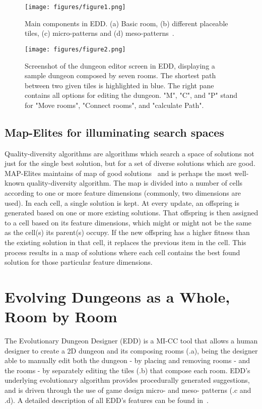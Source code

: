 \documentclass[conference]{IEEEtran}
\begin{document}
\begin{figure}[t]
\centerline{\texttt{[image: figures/figure1.png]}}
\caption{Main components in EDD. (a) Basic room, (b) different placeable tiles, (c) micro-patterns and (d) meso-patterns~\cite{Alvarez2018a}.}
\label{figs:basecomponents}
\end{figure}

\begin{figure}[t]
\centerline{\texttt{[image: figures/figure2.png]}}
\caption{Screenshot of the dungeon editor screen in EDD, displaying a sample dungeon composed by seven rooms. The shortest path between two given tiles is highlighted in blue. The right pane contains all options for editing the dungeon. "M", "C", and "P" stand for "Move rooms", "Connect rooms", and "calculate Path".}
\label{figs:dungeonscreen}
\end{figure}

\subsection{Map-Elites for illuminating search spaces}

Quality-diversity algorithms are algorithms which search a space of solutions not just for the single best solution, but for a set of diverse solutions which are good. MAP-Elites maintains of map of good solutions~\cite{Mouret2015} and is perhaps the most well-known quality-diversity algorithm. The map is divided into a number of cells according to one or more feature dimensions (commonly, two dimensions are used). In each cell, a single solution is kept. At every update, an offspring is generated based on one or more existing solutions. That offspring is then assigned to a cell based on its feature dimensions, which might or might not be the same as the cell(s) its parent(s) occupy. %
If the new offspring has a higher fitness than the existing solution in that cell, it replaces the previous item in the cell. This process results in a map of solutions where each cell contains the best found solution for those particular feature dimensions.

\section{Evolving Dungeons as a Whole, Room by Room}

The Evolutionary Dungeon Designer (EDD) is a MI-CC tool that allows a human designer to create a 2D dungeon and its composing rooms (.a), being the designer able to manually edit both the dungeon - by placing and removing rooms - and the rooms - by separately editing the tiles (.b) that compose each room. EDD's underlying evolutionary algorithm provides procedurally generated suggestions, and is driven through the use of game design micro- and meso- patterns (.c and .d). A detailed description of all EDD's features can be found in~\cite{Baldwin2017a, Baldwin2017, Alvarez2018, Alvarez2018a}.
\end{document}
